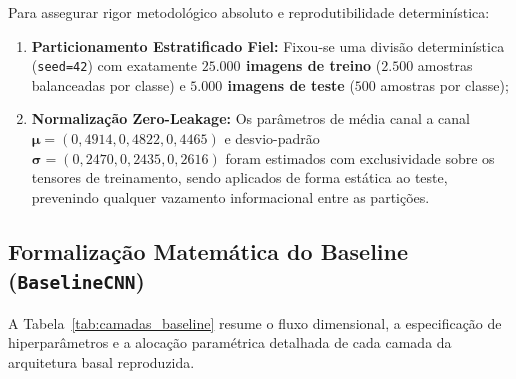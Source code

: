 \documentclass[runningheads]{llncs}
\begin{document}
Para assegurar rigor metodol\'{o}gico absoluto e reprodutibilidade determin\'{i}stica:
\begin{enumerate}
    \item \textbf{Particionamento Estratificado Fiel:} Fixou-se uma divis\~{a}o determin\'{i}stica (\texttt{seed=42}) com exatamente \textbf{$25.000$ imagens de treino} ($2.500$ amostras balanceadas por classe) e \textbf{$5.000$ imagens de teste} ($500$ amostras por classe);
    \item \textbf{Normaliza\c{c}\~{a}o Zero-Leakage:} Os par\^{a}metros de m\'{e}dia canal a canal $\boldsymbol{\mu} = (0{,}4914, 0{,}4822, 0{,}4465)$ e desvio-padr\~{a}o $\boldsymbol{\sigma} = (0{,}2470, 0{,}2435, 0{,}2616)$ foram estimados com exclusividade sobre os tensores de treinamento, sendo aplicados de forma est\'{a}tica ao teste, prevenindo qualquer vazamento informacional entre as parti\c{c}\~{o}es.
\end{enumerate}

\subsection{Formaliza\c{c}\~{a}o Matem\'{a}tica do Baseline (\texttt{BaselineCNN})}
A Tabela~\ref{tab:camadas_baseline} resume o fluxo dimensional, a especifica\c{c}\~{a}o de hiperpar\^{a}metros e a aloca\c{c}\~{a}o param\'{e}trica detalhada de cada camada da arquitetura basal reproduzida.
\end{document}
